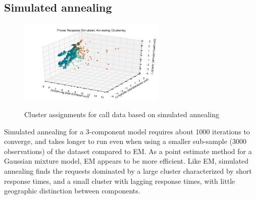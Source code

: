 \documentclass[twoside]{article}
\theoremstyle{theorem}
\theoremstyle{theorem}
\theoremstyle{theorem}
\theoremstyle{lemma}
\theoremstyle{definition}
\theoremstyle{example}
\begin{document}
\subsection{Simulated annealing}
\begin{figure}
\begin{center}\label{SAcluster}
\includegraphics[width=70mm]{simulated_annealing_clustering}
\caption{Cluster assignments for call data based on simulated annealing}
\end{center}
\end{figure}
Simulated annealing for a 3-component model requires about 1000 iterations to converge, and takes longer to run even when using a smaller sub-sample (3000 observations) of the dataset compared to EM. As a point estimate method for a Gaussian mixture model, EM appears to be more efficient. Like EM, simulated annealing finds the requests dominated by a large cluster characterized by short response times, and a small cluster with lagging response times, with little geographic distinction between components. 
\end{document}
